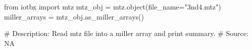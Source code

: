 from iotbx import mtz
mtz_obj = mtz.object(file_name="3nd4.mtz")
miller_arrays = mtz_obj.as_miller_arrays()

# Description:  Read mtz file into a miller array and print summary.
# Source:  NA

